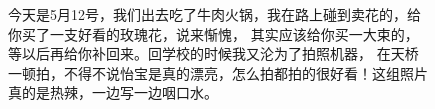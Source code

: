 \documentclass[cn,11pt,chinese]{elegantbook}
\begin{document}
\begin{figure}
    \caption{今天是5月12号，我们出去吃了牛肉火锅，我在路上碰到卖花的，给你买了一支好看的玫瑰花，说来惭愧，
    其实应该给你买一大束的，等以后再给你补回来。回学校的时候我又沦为了拍照机器，
    在天桥一顿拍，不得不说怡宝是真的漂亮，怎么拍都拍的很好看！这组照片真的是热辣，一边写一边咽口水。}
\end{figure}
\end{document}
